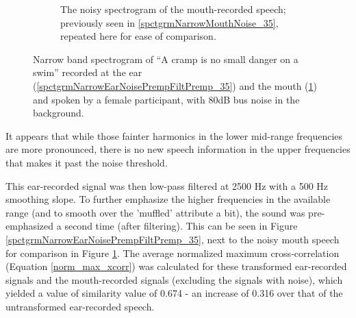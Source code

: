 \begin{figure}[b!]
\begin{subfigure}{0.475\textwidth}
  \caption{The noisy spectrogram of the mouth-recorded speech; previously seen in \ref{spctgrmNarrowMouthNoise_35}, repeated here for ease of comparison.}
  \label{spctgrmNarrowMouthNoise_35_compare}
\end{subfigure}
\caption{Narrow band spectrogram of ``A cramp is no small danger on a swim'' recorded at the ear (\ref{spctgrmNarrowEarNoisePrempFiltPremp_35}) and the mouth (\ref{spctgrmNarrowMouthNoise_35_compare}) and spoken by a female participant, with 80dB bus noise in the background.}
\label{fig:ear_pfp}
\end{figure}
It appears that while those fainter harmonics in the lower mid-range frequencies are more pronounced, there is no new speech information in the upper frequencies that makes it past the noise threshold.

This ear-recorded signal was then low-pass filtered at 2500 Hz with a 500 Hz smoothing slope. To further emphasize the higher frequencies in the available range (and to smooth over the 'muffled' attribute a bit), the sound was pre-emphasized a second time (after filtering).  This can be seen in Figure \ref{spctgrmNarrowEarNoisePrempFiltPremp_35}, next to the noisy mouth speech for comparison in Figure \ref{spctgrmNarrowMouthNoise_35_compare}.  The average normalized maximum cross-correlation (Equation \ref{norm_max_xcorr}) was calculated for these transformed ear-recorded signals and the mouth-recorded signals (excluding the signals with noise), which yielded a value of similarity value of 0.674 - an increase of 0.316 over that of the untransformed ear-recorded speech.

\DIFaddbegin {}\textbf{} 




